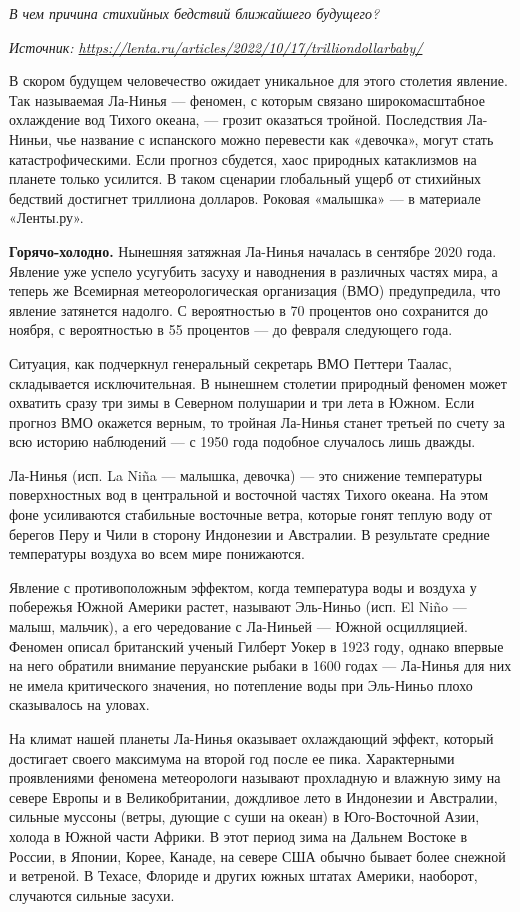 \textit{В чем причина стихийных бедствий ближайшего будущего?}

\textit{Источник: \url{https://lenta.ru/articles/2022/10/17/trilliondollarbaby/}}

В скором будущем человечество ожидает уникальное для этого столетия явление. Так называемая Ла-Нинья — феномен, с которым связано широкомасштабное охлаждение вод Тихого океана, — грозит оказаться тройной. Последствия Ла-Ниньи, чье название с испанского можно перевести как «девочка», могут стать катастрофическими. Если прогноз сбудется, хаос природных катаклизмов на планете только усилится. В таком сценарии глобальный ущерб от стихийных бедствий достигнет триллиона долларов. Роковая «малышка» — в материале «Ленты.ру».

\textbf{Горячо-холодно.} Нынешняя затяжная Ла-Нинья началась в сентябре 2020 года. Явление уже успело усугубить засуху и наводнения в различных частях мира, а теперь же Всемирная метеорологическая организация (ВМО) предупредила, что явление затянется надолго. С вероятностью в 70 процентов оно сохранится до ноября, с вероятностью в 55 процентов — до февраля следующего года.

Ситуация, как подчеркнул генеральный секретарь ВМО Петтери Таалас, складывается исключительная. В нынешнем столетии природный феномен может охватить сразу три зимы в Северном полушарии и три лета в Южном. Если прогноз ВМО окажется верным, то тройная Ла-Нинья станет третьей по счету за всю историю наблюдений — с 1950 года подобное случалось лишь дважды.

Ла-Нинья (исп. La Niña — малышка, девочка) — это снижение температуры поверхностных вод в центральной и восточной частях Тихого океана. На этом фоне усиливаются стабильные восточные ветра, которые гонят теплую воду от берегов Перу и Чили в сторону Индонезии и Австралии. В результате средние температуры воздуха во всем мире понижаются.

Явление с противоположным эффектом, когда температура воды и воздуха у побережья Южной Америки растет, называют Эль-Ниньо (исп. El Niño — малыш, мальчик), а его чередование с Ла-Ниньей — Южной осцилляцией. Феномен описал британский ученый Гилберт Уокер в 1923 году, однако впервые на него обратили внимание перуанские рыбаки в 1600 годах — Ла-Нинья для них не имела критического значения, но потепление воды при Эль-Ниньо плохо сказывалось на уловах.

На климат нашей планеты Ла-Нинья оказывает охлаждающий эффект, который достигает своего максимума на второй год после ее пика. Характерными проявлениями феномена метеорологи называют прохладную и влажную зиму на севере Европы и в Великобритании, дождливое лето в Индонезии и Австралии, сильные муссоны (ветры, дующие с суши на океан) в Юго-Восточной Азии, холода в Южной части Африки. В этот период зима на Дальнем Востоке в России, в Японии, Корее, Канаде, на севере США обычно бывает более снежной и ветреной. В Техасе, Флориде и других южных штатах Америки, наоборот, случаются сильные засухи.

